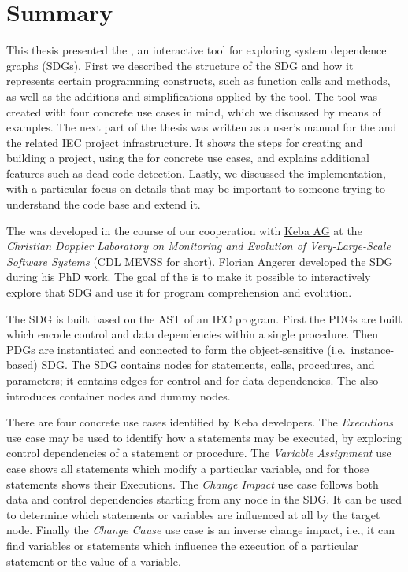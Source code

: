 \chapter{Summary} \label{ch:summary}

This thesis presented the \SB, an interactive tool for exploring system dependence graphs (SDGs). First we described 
the structure of the SDG and how it represents certain programming constructs, such as function calls and methods, as 
well as the additions and simplifications applied by the tool. The tool was created with four concrete use cases in 
mind, which we discussed by means of examples. The next part of the thesis was written as a user's manual for the \SB 
and the related IEC project infrastructure. It shows the steps for creating and building a project, using the \SB for 
concrete use cases, and explains additional features such as dead code detection. Lastly, we discussed the 
implementation, with a particular focus on details that may be important to someone trying to understand the \SB code 
base and extend it.

The \SB was developed in the course of our cooperation with \href{http://www.keba.com}{Keba AG} at the \emph{Christian 
Doppler Laboratory on Monitoring and Evolution of Very-Large-Scale Software Systems} (CDL MEVSS for short). Florian 
Angerer developed the SDG during his PhD work. The goal of the \SB is to make it possible to interactively explore that 
SDG and use it for program comprehension and evolution.

The SDG is built based on the AST of an IEC program. First the PDGs are built which encode control and data 
dependencies within a single procedure. Then PDGs are instantiated and connected to form the object-sensitive (i.e.\ 
instance-based) SDG. The SDG contains nodes for statements, calls, procedures, and parameters; it contains edges for 
control and for data dependencies. The \SB also introduces container nodes and dummy nodes.
  
There are four concrete use cases identified by Keba developers. The \emph{Executions} use case may be used to identify 
how a statements may be executed, by exploring control dependencies of a statement or procedure. The \emph{Variable   
Assignment} use case shows all statements which modify a particular variable, and for those statements shows their 
Executions. The \emph{Change Impact} use case follows both data and control dependencies starting from any node in the 
SDG. It can be used to determine which statements or variables are influenced at all by the target node. Finally the 
\emph{Change Cause} use case is an inverse change impact, i.e., it can find variables or statements which influence the 
execution of a particular statement or the value of a variable.

